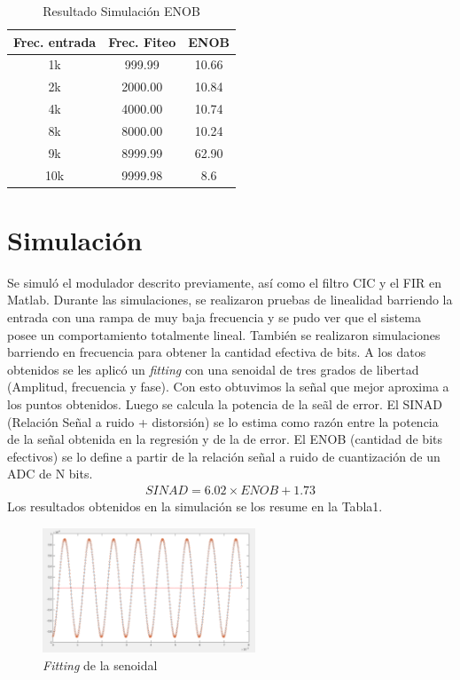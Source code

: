 \documentclass[a4paper,conference]{IEEEtran}
\begin{document}
\begin{table}[!b]
\renewcommand{\arraystretch}{1.3}
\caption{Resultado Simulaci\'on ENOB}
\label{Tabla_1}
\centering
\begin{tabular}{|c|c|c|}
\hline
Frec. entrada & Frec. Fiteo & ENOB\\
\hline
1k & 999.99 & 10.66\\
\hline
2k & 2000.00 & 10.84\\
\hline
4k & 4000.00 & 10.74\\
\hline
8k & 8000.00 & 10.24\\
\hline
9k & 8999.99 & 62.90\\
\hline
10k & 9999.98 & 8.6\\
\hline
\end{tabular}
\end{table}

\section{Simulaci\'on}
Se simul\'o el modulador descrito previamente, as\'i como el filtro CIC y el FIR en Matlab.
Durante las simulaciones, se realizaron pruebas de linealidad barriendo la entrada con una rampa de muy baja frecuencia y se pudo ver que el sistema posee un comportamiento totalmente lineal.
Tambi\'en se realizaron simulaciones barriendo en frecuencia para obtener la cantidad efectiva de bits.
A los datos obtenidos se les aplic\'o un \textit{fitting} con una senoidal de tres grados de libertad (Amplitud, frecuencia y fase). Con esto obtuvimos la se\~nal que mejor aproxima a los puntos obtenidos. Luego se calcula la potencia de la se\~al de error. El SINAD (Relaci\'on Se\~nal a ruido + distorsi\'on) se lo estima como raz\'on entre la potencia de la se\~nal obtenida en la regresi\'on y de la de error. El ENOB (cantidad de bits efectivos) se lo define a partir de la relaci\'on se\~nal a ruido de cuantizaci\'on de un ADC de N bits.
\begin{align}
SINAD=6.02 \times ENOB + 1.73
\end{align}
Los resultados obtenidos en la simulaci\'on se los resume en la Tabla1.

\begin{figure}[!t]
\centering
\includegraphics[width=2.5in]{Simulacion_fiteo}
\caption{\textit{Fitting} de la senoidal}
\label{fig_11}
\end{figure}
\end{document}
